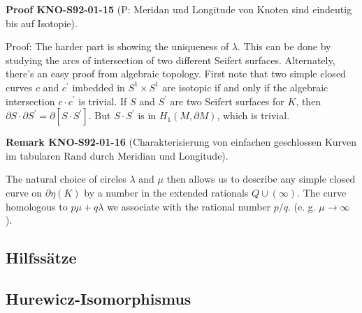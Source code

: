 \documentclass[10pt, letterpaper]{article}
\newcommand{\CustomHeading}[3]{%
  \par\medskip\noindent%
  \textbf{#1 #2} \textnormal{(#3)}.\enskip%
}
\newenvironment{REM}[2]{\CustomHeading{Remark}{#1}{#2}}{}
\newenvironment{PROOF}[2]{\CustomHeading{Proof}{#1}{#2}}{}
\begin{document}
\begin{PROOF}{KNO-S92-01-15}{P: Meridan und Longitude von Knoten sind eindeutig bis auf Isotopie}
Proof: The harder part is showing the uniqueness of $\lambda$. This can be done by studying the arcs of intersection of two different Seifert surfaces. Alternately, there's an easy proof from algebraic topology. First note that two simple closed curves $c$ and $c^{\prime}$ imbedded in $S^{1} \times S^{1}$ are isotopic if and only if the algebraic intersection $c \cdot c^{\prime}$ is trivial. If $S$ and $S^{\prime}$ are two Seifert surfaces for $K$, then $\partial S \cdot \partial S^{\prime}=\partial\left[S \cdot S^{\prime}\right]$. But $S \cdot S^{\prime}$ is in $H_{1}(M, \partial M)$, which is trivial.
\end{PROOF}

\begin{REM}{KNO-S92-01-16}{Charakterisierung von einfachen geschlossen Kurven im tabularen Rand durch Meridian und Longitude}
The natural choice of circles $\lambda$ and $\mu$ then allows us to describe any simple closed curve on $\partial \eta(K)$ by a number in the extended rationals $Q \cup(\infty)$. The curve homologous to $p \mu+q \lambda$ we associate with the rational number $p / q$. (e. g. $\mu \rightarrow \infty$ ).
\end{REM}

\subsection{Hilfssätze}

\subsection{Hurewicz-Isomorphismus}
\end{document}
